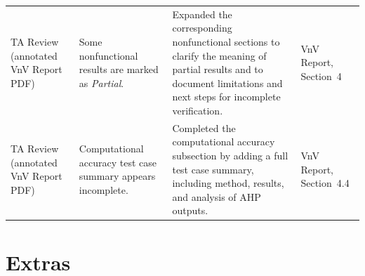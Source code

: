 \documentclass{article}
\begin{document}
\begin{longtable}{p{} p{}
                  p{} p{}}
TA Review (annotated VnV Report PDF)
&
Some nonfunctional results are marked as \textit{Partial}.
&
Expanded the corresponding nonfunctional sections to clarify the
meaning of partial results and to document limitations and next steps
for incomplete verification.
&
VnV Report, Section~4
\\

TA Review (annotated VnV Report PDF)
&
Computational accuracy test case summary appears incomplete.
&
Completed the computational accuracy subsection by adding a full test
case summary, including method, results, and analysis of AHP outputs.
&
VnV Report, Section~4.4
\\

\end{longtable}






\section{Extras}
\end{document}
